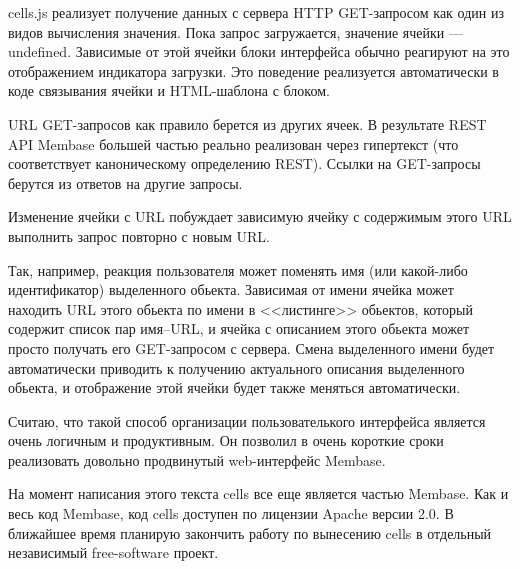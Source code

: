 \documentclass[10pt, a5paper]{article}
\begin{document}
cells.js реализует получение данных с сервера HTTP GET-запросом как
один из видов вычисления значения. Пока запрос загружается, значение
ячейки --- undefined. Зависимые от этой ячейки блоки интерфейса
обычно реагируют на это отображением индикатора загрузки. Это
поведение реализуется автоматически в коде связывания ячейки и
HTML-шаблона с блоком.

URL GET-запросов как правило берется из других ячеек. В результате
REST API Membase большей частью реально реализован через гипертекст
(что соответствует каноническому определению REST). Ссылки на GET-запросы 
берутся из ответов на другие запросы.

Изменение ячейки с URL побуждает зависимую ячейку с содержимым этого
URL выполнить запрос повторно с новым URL.

Так, например, реакция пользователя может поменять имя (или какой-либо
идентификатор) выделенного обьекта. Зависимая от имени ячейка может
находить URL этого обьекта по имени в <<листинге>> обьектов, который
содержит список пар имя--URL, и ячейка с описанием этого обьекта может
просто получать его GET-запросом с сервера. Смена выделенного имени
будет автоматически приводить к получению актуального описания
выделенного обьекта, и отображение этой ячейки будет также меняться
автоматически.

Считаю, что такой способ организации пользователького интерфейса
является очень логичным и продуктивным.  Он позволил в очень
короткие сроки реализовать довольно продвинутый web-интерфейс Membase.

На момент написания этого текста cells все еще является частью
Membase. Как и весь код Membase, код cells доступен по лицензии Apache
версии 2.0. В ближайшее время планирую закончить работу по вынесению
cells в отдельный независимый free-software проект.
\end{document}
